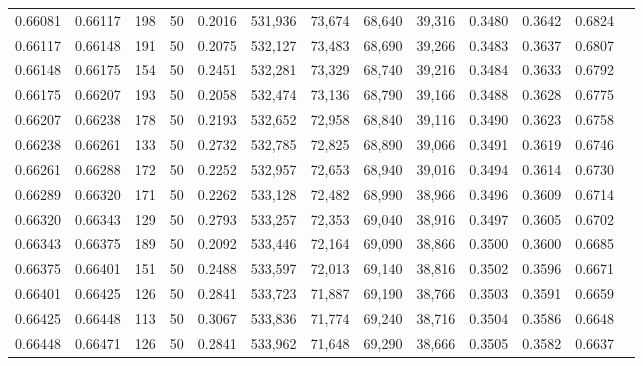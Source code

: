 \begin{tabular}{rrrrrrrrrrrrr}
0.66081 & 0.66117 &   198 &  50 &                                     0.2016 & 531,936 &  73,674 &  68,640 &  39,316 & 0.3480 & 0.3642 & 0.6824 \\
0.66117 & 0.66148 &   191 &  50 &                                     0.2075 & 532,127 &  73,483 &  68,690 &  39,266 & 0.3483 & 0.3637 & 0.6807 \\
0.66148 & 0.66175 &   154 &  50 &                                     0.2451 & 532,281 &  73,329 &  68,740 &  39,216 & 0.3484 & 0.3633 & 0.6792 \\
0.66175 & 0.66207 &   193 &  50 &                                     0.2058 & 532,474 &  73,136 &  68,790 &  39,166 & 0.3488 & 0.3628 & 0.6775 \\
0.66207 & 0.66238 &   178 &  50 &                                     0.2193 & 532,652 &  72,958 &  68,840 &  39,116 & 0.3490 & 0.3623 & 0.6758 \\
0.66238 & 0.66261 &   133 &  50 &                                     0.2732 & 532,785 &  72,825 &  68,890 &  39,066 & 0.3491 & 0.3619 & 0.6746 \\
0.66261 & 0.66288 &   172 &  50 &                                     0.2252 & 532,957 &  72,653 &  68,940 &  39,016 & 0.3494 & 0.3614 & 0.6730 \\
0.66289 & 0.66320 &   171 &  50 &                                     0.2262 & 533,128 &  72,482 &  68,990 &  38,966 & 0.3496 & 0.3609 & 0.6714 \\
0.66320 & 0.66343 &   129 &  50 &                                     0.2793 & 533,257 &  72,353 &  69,040 &  38,916 & 0.3497 & 0.3605 & 0.6702 \\
0.66343 & 0.66375 &   189 &  50 &                                     0.2092 & 533,446 &  72,164 &  69,090 &  38,866 & 0.3500 & 0.3600 & 0.6685 \\
0.66375 & 0.66401 &   151 &  50 &                                     0.2488 & 533,597 &  72,013 &  69,140 &  38,816 & 0.3502 & 0.3596 & 0.6671 \\
0.66401 & 0.66425 &   126 &  50 &                                     0.2841 & 533,723 &  71,887 &  69,190 &  38,766 & 0.3503 & 0.3591 & 0.6659 \\
0.66425 & 0.66448 &   113 &  50 &                                     0.3067 & 533,836 &  71,774 &  69,240 &  38,716 & 0.3504 & 0.3586 & 0.6648 \\
0.66448 & 0.66471 &   126 &  50 &                                     0.2841 & 533,962 &  71,648 &  69,290 &  38,666 & 0.3505 & 0.3582 & 0.6637 \\

\end{tabular}
